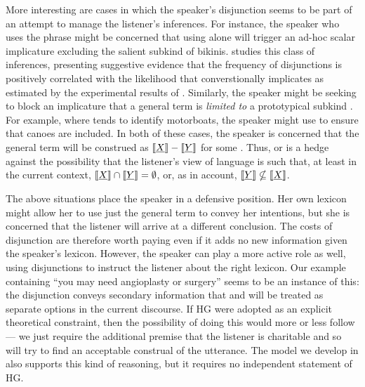 \documentclass{article}
\begin{document}
More interesting are cases in which the speaker's disjunction seems to
be part of an attempt to manage the listener's inferences. For
instance, the speaker who uses the phrase 
might be concerned that using  alone will trigger an
ad-hoc scalar implicature \citep{Hirschberg85} excluding the salient
subkind of bikinis. \citet{Chemla-HurfordCounts} studies this class of
inferences, presenting suggestive evidence that the frequency of
disjunctions  is positively correlated with the
likelihood that  converstionally implicates  as
estimated by the experimental results of \citet{vanTiel-etal:2013}.
Similarly, the speaker might be seeking to block an implicature that a
general term is \emph{limited to} a prototypical subkind
\citep{Levinson00}. For example, where  tends to identify
motorboats, the speaker might use  to ensure that
canoes are included.  In both of these cases, the speaker is concerned
that the general term  will be construed as
$\llbracket\emph{X}\rrbracket-\llbracket\emph{Y}\rrbracket$ for some . Thus,  or
 is a hedge against the possibility that the listener's view
of language is such that, at least in the current context,
$\llbracket\emph{X}\rrbracket \cap \llbracket\emph{Y}\rrbracket = \emptyset$, or, as in
 account,
$\llbracket\emph{Y}\rrbracket \nsubseteq \llbracket\emph{X}\rrbracket$.

The above situations place the speaker in a defensive position. Her
own lexicon might allow her to use just the general term to convey her
intentions, but she is concerned that the listener will arrive at a
different conclusion. The costs of disjunction are therefore worth
paying even if it adds no new information given the speaker's lexicon.
However, the speaker can play a more active role as well, using
disjunctions to instruct the listener about the right lexicon. Our
 example containing ``you may need
angioplasty or surgery'' seems to be an instance of this: the
disjunction conveys secondary information that  and
 will be treated as separate options in the current
discourse. If HG were adopted as an explicit theoretical constraint,
then the possibility of doing this would more or less follow --- we
just require the additional premise that the listener is charitable
and so will try to find an acceptable construal of the utterance. The
model we develop in  also supports this kind of
reasoning, but it requires no independent statement of HG.
 
\end{document}
